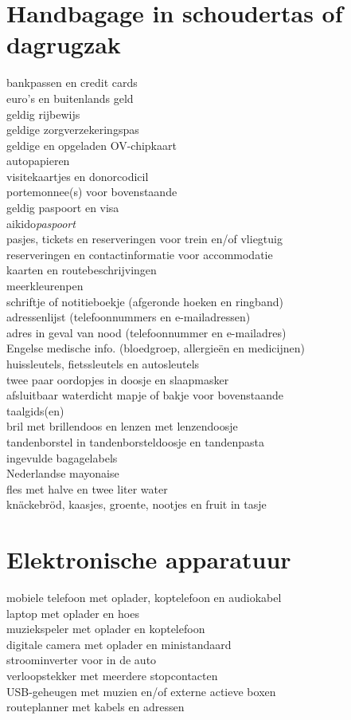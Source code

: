 \documentclass[9pt,twocolumn]{memoir}
\begin{document}
\section*{Handbagage in schoudertas of dagrugzak}%
bankpassen en credit cards\\%
euro's en buitenlands geld\\%
geldig rijbewijs\\%
geldige zorgverzekeringspas\\%
geldige en opgeladen OV-chipkaart\\%
autopapieren\\%
visitekaartjes en donorcodicil\\%
portemonnee(s) voor bovenstaande\\%
geldig paspoort en visa\\%
aikido{\itshape{paspoort}}\\%
pasjes, tickets en reserveringen voor trein en/of vliegtuig\\%
reserveringen en contactinformatie voor accommodatie\\%
kaarten en routebeschrijvingen\\%
meerkleurenpen\\%
schriftje of notitieboekje (afgeronde hoeken en ringband)\\%
adressenlijst (telefoonnummers en e-mailadressen)\\%
adres in geval van nood (telefoonnummer en e-mailadres)\\%
Engelse medische info. (bloedgroep, allergieën en medicijnen)\\%
huissleutels, fietssleutels en autosleutels\\%
twee paar oordopjes in doosje en slaapmasker\\%
afsluitbaar waterdicht mapje of bakje voor bovenstaande\\%
taalgids(en)\\%
bril met brillendoos en lenzen met lenzendoosje\\%
tandenborstel in tandenborsteldoosje en tandenpasta\\%
ingevulde bagagelabels\\%
Nederlandse mayonaise\\%
fles met halve en twee liter water\\%
knäckebröd, kaasjes, groente, nootjes en fruit in tasje%

\section*{Elektronische apparatuur}%
mobiele telefoon met oplader, koptelefoon en audiokabel\\%
laptop met oplader en hoes\\%
muziekspeler met oplader en koptelefoon\\%
digitale camera met oplader en ministandaard\\%
stroominverter voor in de auto\\%
verloopstekker met meerdere stopcontacten\\%
USB-geheugen met muzien en/of externe actieve boxen\\%
routeplanner met kabels en adressen%
\end{document}
